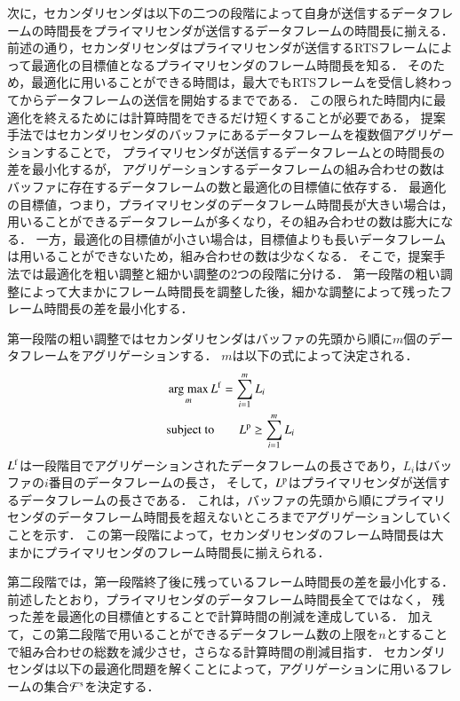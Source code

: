 \documentclass[master]{kuisthesis}		%
\newcommand{\argmax}{\mathop{\rm arg~max}\limits}
\begin{document}
		次に，セカンダリセンダは以下の二つの段階によって自身が送信するデータフレームの時間長をプライマリセンダが送信するデータフレームの時間長に揃える．
		前述の通り，セカンダリセンダはプライマリセンダが送信するRTSフレームによって最適化の目標値となるプライマリセンダのフレーム時間長を知る．
		そのため，最適化に用いることができる時間は，最大でもRTSフレームを受信し終わってからデータフレームの送信を開始するまでである．
		この限られた時間内に最適化を終えるためには計算時間をできるだけ短くすることが必要である，
		提案手法ではセカンダリセンダのバッファにあるデータフレームを複数個アグリゲーションすることで，
		プライマリセンダが送信するデータフレームとの時間長の差を最小化するが，
		アグリゲーションするデータフレームの組み合わせの数はバッファに存在するデータフレームの数と最適化の目標値に依存する．
		最適化の目標値，つまり，プライマリセンダのデータフレーム時間長が大きい場合は，
		用いることができるデータフレームが多くなり，その組み合わせの数は膨大になる．
		一方，最適化の目標値が小さい場合は，目標値よりも長いデータフレームは用いることができないため，組み合わせの数は少なくなる．
		そこで，提案手法では最適化を粗い調整と細かい調整の2つの段階に分ける．
		第一段階の粗い調整によって大まかにフレーム時間長を調整した後，細かな調整によって残ったフレーム時間長の差を最小化する．
		\par
		第一段階の粗い調整ではセカンダリセンダはバッファの先頭から順に$m$個のデータフレームをアグリゲーションする．
		$m$は以下の式によって決定される．
		\begin{align}
			&\argmax_m L^{\rm f} = \sum_{i = 1}^{m} L_i \\
			&{\rm subject \ to} \qquad  L^{\rm p} \geq \sum_{i = 1}^{m} L_i
		\end{align}
		$L^{\rm f}$は一段階目でアグリゲーションされたデータフレームの長さであり，$L_i$はバッファの$i$番目のデータフレームの長さ，
		そして，$L^{\rm p}$はプライマリセンダが送信するデータフレームの長さである．
		これは，バッファの先頭から順にプライマリセンダのデータフレーム時間長を超えないところまでアグリゲーションしていくことを示す．
		この第一段階によって，セカンダリセンダのフレーム時間長は大まかにプライマリセンダのフレーム時間長に揃えられる．
		\par
		第二段階では，第一段階終了後に残っているフレーム時間長の差を最小化する．
		前述したとおり，プライマリセンダのデータフレーム時間長全てではなく，
		残った差を最適化の目標値とすることで計算時間の削減を達成している．
		加えて，この第二段階で用いることができるデータフレーム数の上限を$n$とすることで組み合わせの総数を減少させ，さらなる計算時間の削減目指す．
		セカンダリセンダは以下の最適化問題を解くことによって，アグリゲーションに用いるフレームの集合${\mathcal F}^{\rm s}$を決定する．
\end{document}
